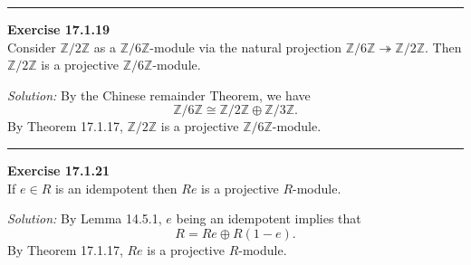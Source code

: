 \documentclass[a4paper, 12pt]{article}
\newenvironment{problem}[2][Exercise]
    { \begin{mdframed}[backgroundcolor=gray!20] \textbf{#1 #2} \\}
    {  \end{mdframed}}
\newenvironment{solution}
    {\textit{Solution:}}
    {}
\begin{document}
\noindent\rule{7in}{2.8pt}
\begin{problem}{17.1.19}
Consider \(\mathbb{Z}/2 \mathbb{Z}\) as a \(\mathbb{Z}/6 \mathbb{Z}\)-module via the natural projection \(\mathbb{Z}/6 \mathbb{Z}\twoheadrightarrow \mathbb{Z}/2 \mathbb{Z}\). 
Then \(\mathbb{Z}/2 \mathbb{Z}\) is a projective \(\mathbb{Z}/6 \mathbb{Z}\)-module.
\end{problem}
\begin{solution}
By the Chinese remainder Theorem, we have 
\[\mathbb{Z}/6 \mathbb{Z}\cong \mathbb{Z}/2 \mathbb{Z}\oplus \mathbb{Z}/3 \mathbb{Z}.\]
By Theorem 17.1.17, \(\mathbb{Z}/2 \mathbb{Z}\) is a projective \(\mathbb{Z}/6 \mathbb{Z}\)-module.
\end{solution}

\noindent\rule{7in}{2.8pt}
\begin{problem}{17.1.21}
If \(e\in R\) is an idempotent then \(Re\) is a projective \(R\)-module.
\end{problem}
\begin{solution}
By Lemma 14.5.1, \(e\) being an idempotent implies that 
\[R=Re\oplus R(1-e).\]
By Theorem 17.1.17, \(Re\) is a projective \(R\)-module.
\end{solution}
\end{document}
